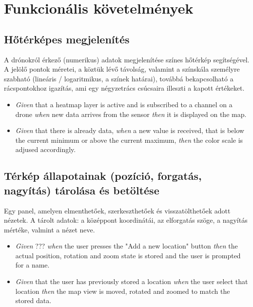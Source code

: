 \section{Funkcionális követelmények}

\subsection{Hőtérképes megjelenítés}

A drónokról érkező (numerikus) adatok megjelenítése színes hőtérkép segítségével.
A jelölő pontok méretei, a köztük lévő távolság, valamint a színskála személyre szabható (lineáris / logaritmikus, a színek határai), továbbá bekapcsolható a rácspontokhoz igazítás, ami egy négyzetrács csúcsaira illeszti a kapott értékeket.

\begin {itemize}
  \item \textit{Given} that a heatmap layer is active and is subscribed to a channel on a drone \textit{when} new data arrives from the sensor \textit{then} it is displayed on the map.
  \item \textit{Given} that there is already data, \textit{when} a new value is received, that is below the current minimum or above the current maximum, \textit{then} the color scale is adjused accordingly.
\end {itemize}


\subsection{Térkép állapotainak (pozíció, forgatás, nagyítás) tárolása és betöltése}

Egy panel, amelyen elmenthetőek, szerkeszthetőek és visszatölthetőek adott nézetek. A tárolt adatok: a középpont koordinátái, az elforgatás szöge, a nagyítás mértéke, valmint a nézet neve.

\begin {itemize}
  \item \textit{Given} ??? \textit{when} the user presses the "Add a new location" button \textit{then} the actual position, rotation and zoom state is stored and the user is prompted for a name.
  \item \textit{Given} that the user has previously stored a location \textit{when} the user select that location \textit{then} the map view is moved, rotated and zoomed to match the stored data.
\end {itemize}


